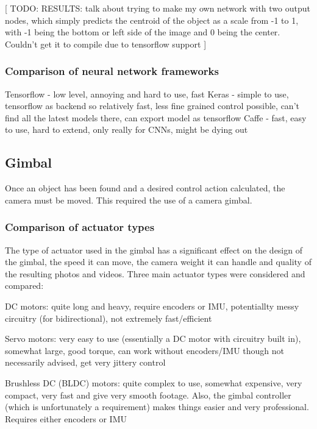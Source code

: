[ TODO: RESULTS: talk about trying to make my own network with two output nodes, which simply predicts the centroid of the object as a scale from -1 to 1, with -1 being the bottom or left side of the image and 0 being the center. Couldn't get it to compile due to tensorflow support ]

\subsubsection{Comparison of neural network frameworks}
Tensorflow - low level, annoying and hard to use, fast
Keras - simple to use, tensorflow as backend so relatively fast, less fine grained control possible, can't find all the latest models there, can export model as tensorflow
Caffe - fast, easy to use, hard to extend, only really for CNNs, might be dying out


\subsection{Gimbal}
Once an object has been found and a desired control action calculated, the camera must be moved. This required the use of a camera gimbal.

\subsubsection{Comparison of actuator types}
The type of actuator used in the gimbal has a significant effect on the design of the gimbal, the speed it can move, the camera weight it can handle and quality of the resulting photos and videos. Three main actuator types were considered and compared:

DC motors: quite long and heavy, require encoders or IMU, potentiallty messy circuitry (for bidirectional), not extremely fast/efficient

Servo motors: very easy to use (essentially a DC motor with circuitry built in), somewhat large, good torque, can work without encoders/IMU though not necessarily advised, get very jittery control

Brushless DC (BLDC) motors: quite complex to use, somewhat expensive, very compact, very fast and give very smooth footage. Also, the gimbal controller (which is unfortunately a requirement) makes things easier and very professional. Requires either encoders or IMU

